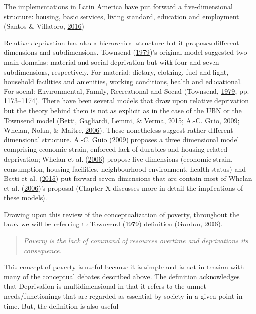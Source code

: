 \documentclass[]{book}
\begin{document}
The implementations in Latin America have put forward a five-dimensional structure: housing, basic services, living standard, education and employment (Santos \& Villatoro, \protect\hyperlink{ref-Santos2016}{2016}).

Relative deprivation has also a hierarchical structure but it proposes different dimensions and subdimensions. Townsend (\protect\hyperlink{ref-Townsend1979}{1979})'s original model suggested two main domains: material and social deprivation but with four and seven subdimensions, respectively. For material: dietary, clothing, fuel and light, household facilities and amenities, working conditions, health and educational. For social: Environmental, Family, Recreational and Social (Townsend, \protect\hyperlink{ref-Townsend1979}{1979}, pp. 1173--1174). There have been several models that draw upon relative deprivation but the theory behind them is not as explicit as in the case of the UBN or the Townsend model (Betti, Gagliardi, Lemmi, \& Verma, \protect\hyperlink{ref-Betti2015}{2015}; A.-C. Guio, \protect\hyperlink{ref-Guio2009a}{2009}; Whelan, Nolan, \& Maitre, \protect\hyperlink{ref-Whelan2006a}{2006}). These nonetheless suggest rather different dimensional structure. A.-C. Guio (\protect\hyperlink{ref-Guio2009a}{2009}) proposes a three dimensional model comprising economic strain, enforced lack of durables and housing-related deprivation; Whelan et al. (\protect\hyperlink{ref-Whelan2006a}{2006}) propose five dimensions (economic strain, consumption, housing facilities, neighbourhood environment, health status) and Betti et al. (\protect\hyperlink{ref-Betti2015}{2015}) put forward seven dimensions that are contain most of Whelan et al. (\protect\hyperlink{ref-Whelan2006a}{2006})'s proposal (Chapter X discusses more in detail the implications of these models).

Drawing upon this review of the conceptualization of poverty, throughout the book we will be referring to Townsend (\protect\hyperlink{ref-Townsend1979}{1979}) definition (Gordon, \protect\hyperlink{ref-Gordon2006}{2006}):

\begin{quote}
\emph{Poverty is the lack of command of resources overtime and deprivations its consequence.}
\end{quote}

This concept of poverty is useful because it is simple and is not in tension with many of the conceptual debates described above. The definition acknowledges that Deprivation is multidimensional in that it refers to the unmet needs/functionings that are regarded as essential by society in a given point in time. But, the definition is also useful
\end{document}
